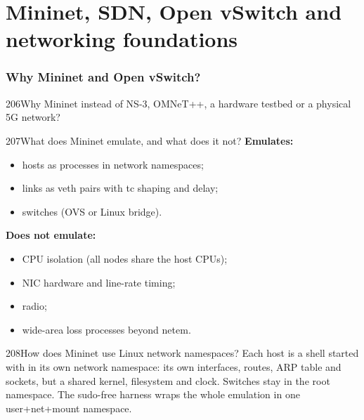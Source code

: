 \part{Mininet, SDN, Open vSwitch and networking foundations}

\section{Why Mininet and Open vSwitch?}

\begin{qa}{206}{Why Mininet instead of NS-3, OMNeT++, a hardware testbed or a physical 5G network?}
\end{qa}

\begin{qa}{207}{What does Mininet emulate, and what does it not?}
\textbf{Emulates:}
\begin{itemize}
\item hosts as processes in network namespaces;
\item links as veth pairs with tc shaping and delay;
\item switches (OVS or Linux bridge).
\end{itemize}
\textbf{Does not emulate:}
\begin{itemize}
\item CPU isolation (all nodes share the host CPUs);
\item NIC hardware and line-rate timing;
\item radio;
\item wide-area loss processes beyond netem.
\end{itemize}
\end{qa}

\begin{qa}{208}{How does Mininet use Linux network namespaces?}
Each host is a shell started with  in its own network namespace: its own interfaces, routes, ARP table
and sockets, but a shared kernel, filesystem and clock. Switches stay in the root namespace. The sudo-free harness
wraps the whole emulation in one user+net+mount namespace.
\end{qa}

